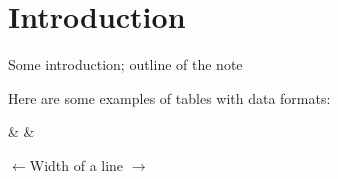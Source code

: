 \section{Introduction}\label{sec:Introduction}

Some introduction; outline of the note

Here are some examples of tables with data formats:

\begin{table}[htb]
  \caption{Example of a table for a 32-bit format}\label{tab:test1}
    \begin{bittabular}{32}
      & \bitNumFourByte
      & \bitNumFourByte
    \end{bittabular}
\end{table}

$\leftarrow$\hfill Width of a line \hfill$\rightarrow$

